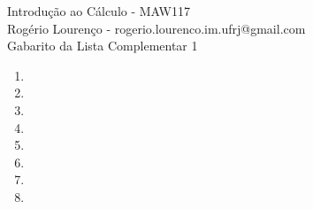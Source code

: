 \documentclass{article}
\begin{document}
\begin{flushleft}
	Introdução ao Cálculo - MAW117\\
	Rogério Lourenço - rogerio.lourenco.im.ufrj@gmail.com\\
	Gabarito da Lista Complementar 1
\end{flushleft}

\begin{enumerate}
	\item
	\item
	\item
	\item
	\item
	\item
	\item
	\item
\end{enumerate}
\end{document}
